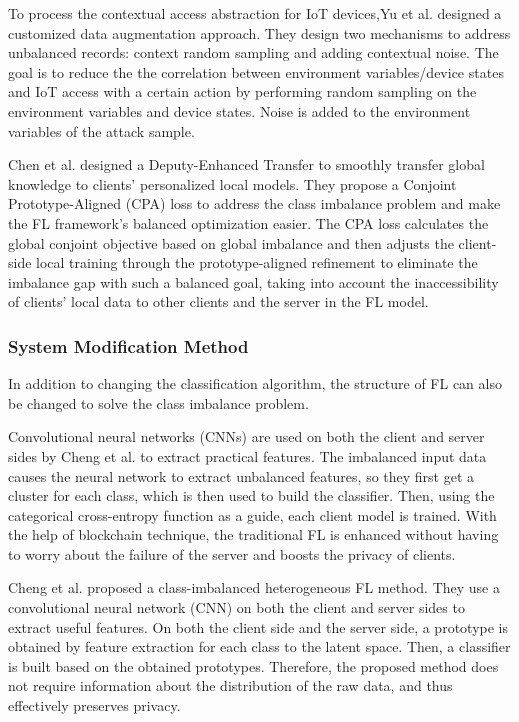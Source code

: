 \documentclass[10pt,journal,compsoc]{IEEEtran}
\begin{document}
	To process the contextual access abstraction for IoT devices,Yu et al. \cite{yu2020learning} designed a customized data augmentation approach. They design two mechanisms to address unbalanced records: context random sampling and adding contextual noise. The goal is to reduce the the correlation between environment variables/device states and IoT access with a certain action by performing random sampling on the environment variables and device states. Noise is added to the environment variables of the attack sample.
	
	Chen et al.\cite{chen2022personalized} designed a Deputy-Enhanced Transfer to smoothly transfer global knowledge to clients' personalized local models. They propose a Conjoint Prototype-Aligned (CPA) loss to address the class imbalance problem and make the FL framework's balanced optimization easier. The CPA loss calculates the global conjoint objective based on global imbalance and then adjusts the client-side local training through the prototype-aligned refinement to eliminate the imbalance gap with such a balanced goal, taking into account the inaccessibility of clients' local data to other clients and the server in the FL model.
	
	\subsubsection{System Modification Method}
	In addition to changing the classification algorithm, the structure of FL can also be changed to solve the class imbalance problem.
	
	Convolutional neural networks (CNNs) are used on both the client and server sides by Cheng et al. \cite{cheng2022blockchain} to extract practical features. The imbalanced input data causes the neural network to extract unbalanced features, so they first get a cluster for each class, which is then used to build the classifier. Then, using the categorical cross-entropy function as a guide, each client model is trained. With the help of blockchain technique, the traditional FL is enhanced without having to worry about the failure of the server and boosts the privacy of clients.
	
	Cheng et al. \cite{cheng2022class} proposed a class-imbalanced heterogeneous FL method. They use a convolutional neural network (CNN) on both the client and server sides to extract useful features. On both the client side and the server side, a prototype is obtained by feature extraction for each class to the latent space. Then, a classifier is built based on the obtained prototypes. Therefore, the proposed method does not require information about the distribution of the raw data, and thus effectively preserves privacy.  
	
\end{document}
